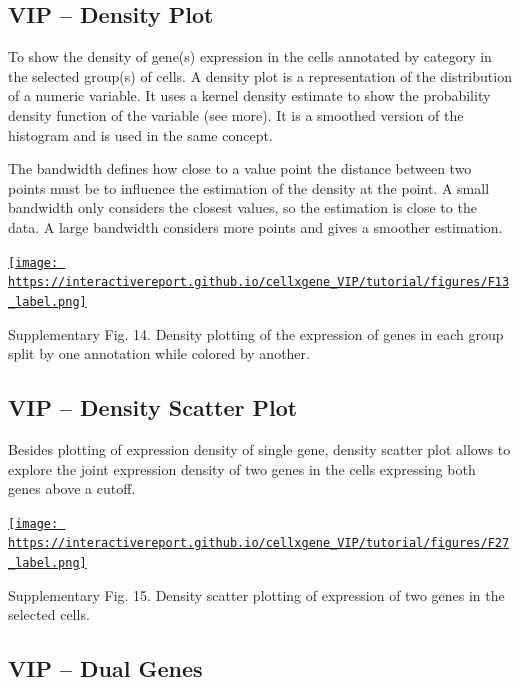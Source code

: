 \documentclass[
]{article}
\begin{document}
\hypertarget{vip-density-plot}{%
\subsection{VIP -- Density Plot}\label{vip-density-plot}}

To show the density of gene(s) expression in the cells annotated by category in the selected group(s) of cells. A density plot is a representation of the distribution of a numeric variable. It uses a kernel density estimate to show the probability density function of the variable (see more). It is a smoothed version of the histogram and is used in the same concept.

The bandwidth defines how close to a value point the distance between two points must be to influence the estimation of the density at the point. A small bandwidth only considers the closest values, so the estimation is close to the data. A large bandwidth considers more points and gives a smoother estimation.

\href{https://interactivereport.github.io/cellxgene_VIP/tutorial/figures/F13_label.png}{\texttt{[image: https://interactivereport.github.io/cellxgene\_VIP/tutorial/figures/F13\_label.png]}}

Supplementary Fig. 14. Density plotting of the expression of genes in each group split by one annotation while colored by another.

\hypertarget{vip-density-scatter-plot}{%
\subsection{VIP -- Density Scatter Plot}\label{vip-density-scatter-plot}}

Besides plotting of expression density of single gene, density scatter plot allows to explore the joint expression density of two genes in the cells expressing both genes above a cutoff.

\href{https://interactivereport.github.io/cellxgene_VIP/tutorial/figures/F27_label.png}{\texttt{[image: https://interactivereport.github.io/cellxgene\_VIP/tutorial/figures/F27\_label.png]}}

Supplementary Fig. 15. Density scatter plotting of expression of two genes in the selected cells.

\hypertarget{vip-dual-genes}{%
\subsection{VIP -- Dual Genes}\label{vip-dual-genes}}
\end{document}
